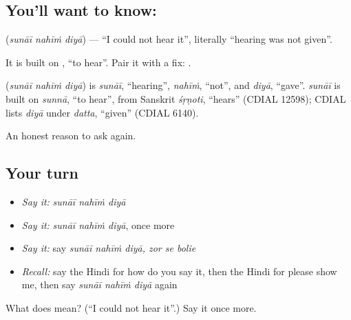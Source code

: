 \subsection*{You'll want to know:   }
\textbf{  } (\emph{sunāī nahīṁ diyā}) — \textquotedblleft{}I could not hear it\textquotedblright{}, literally \textquotedblleft{}hearing was not given\textquotedblright{}.

It is built on \textbf{}, \textquotedblleft{}to hear\textquotedblright{}. Pair it with a fix: \textbf{  }.

\begin{cousinweb}
\textbf{  } (\emph{sunāī nahīṁ diyā}) is \emph{sunāī}, \textquotedblleft{}hearing\textquotedblright{}, \emph{nahīṁ}, \textquotedblleft{}not\textquotedblright{}, and \emph{diyā}, \textquotedblleft{}gave\textquotedblright{}. \emph{sunāī} is built on \emph{sunnā}, \textquotedblleft{}to hear\textquotedblright{}, from Sanskrit \emph{śṛṇoti}, \textquotedblleft{}hears\textquotedblright{} (CDIAL 12598); CDIAL lists \emph{diyā} under \emph{datta}, \textquotedblleft{}given\textquotedblright{} (CDIAL 6140).
\end{cousinweb}

\begin{grammarlens}[title={What you've built}]
An honest reason to ask again.
\end{grammarlens}

\subsection*{Your turn}
\begin{itemize}
\raggedright
  \item \emph{Say it:} \emph{sunāī nahīṁ diyā}
  \item \emph{Say it:} \emph{sunāī nahīṁ diyā}, once more
  \item \emph{Say it:} say \emph{sunāī nahīṁ diyā, zor se bolie}
  \item \emph{Recall:} say the Hindi for how do you say it, then the Hindi for please show me, then say \emph{sunāī nahīṁ diyā} again
\end{itemize}

\begin{tcolorbox}[breakable,colback=teal!4,colframe=teal!35!black,title={Before you move on}]
What does    mean? (\textquotedblleft{}I could not hear it\textquotedblright{}.) Say it once more.
\end{tcolorbox}
